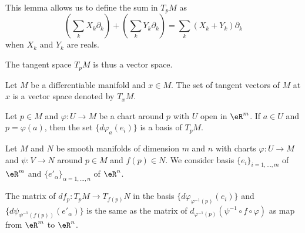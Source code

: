 This lemma allows us to define the sum in \( T_pM\) as      %
\begin{equation}
    \left( \sum_kX_k\partial_k \right)+\left( \sum_kY_k\partial_k \right)=\sum_k (X_k+Y_k)\partial_k
\end{equation}
when \( X_k\) and \( Y_k\) are reals.

The tangent space \( T_pM\) is thus a vector space.

\begin{proposition}     \label{PROPooOHLQooCNetuD}
    Let \( M\) be a differentiable manifold and \( x\in M\). The set of tangent vectors of \( M\) at \( x\) is a vector space denoted by \( T_xM\).
\end{proposition}

\begin{proposition}     \label{PROPooWXNDooPeORjA}
    Let \( p\in M\) and \( \varphi\colon U\to M\) be a chart around \( p\) with \( U\) open in \( \eR^m\). If \( a\in U\) and \( p=\varphi(a)\), then  the set \( \{  d\varphi_a(e_i) \}\) is a basis of \( T_pM\).
\end{proposition}

\begin{lemma}       \label{LEMooVCSJooEuDZFz}
    Let \( M\) and \( N\) be smooth manifolds of dimension \( m\) and \( n\) with charts \( \varphi\colon U\to M\) and \( \psi\colon V\to N\) around \( p\in M\) and \( f(p)\in N\). We consider basis \( \{ e_i \}_{i=1,\ldots, m}\) of \( \eR^m\) and \( \{ e'_{\alpha} \}_{\alpha=1,\ldots, n}\) of \( \eR^n\).

    The matrix of \( df_p\colon T_pM\to T_{f(p)}N\) in the basis \( \{ d\varphi_{\varphi^{-1}(p)}(e_i) \}\) and \( \{ d\psi_{\psi^{-1}(f(p))}(e'_{\alpha}) \}\) is the same as the matrix of \( d_{\varphi^{-1}(p)}(\psi^{-1}\circ f\circ\varphi)\) as map from \( \eR^m\) to \( \eR^n\).
\end{lemma}

